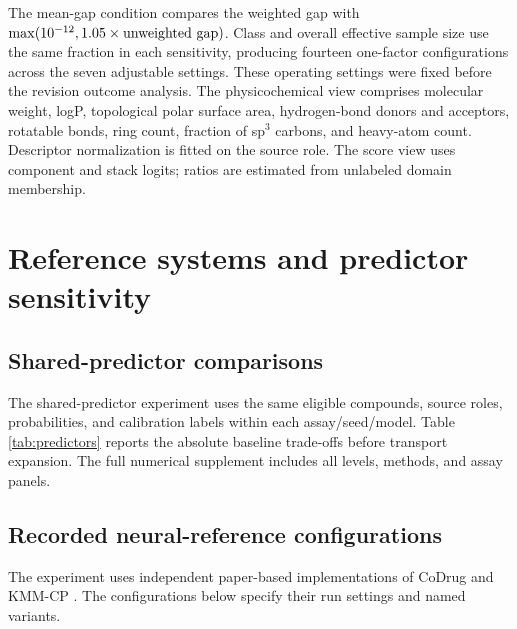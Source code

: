 The mean-gap condition compares the weighted gap with $\max(10^{-12},1.05\times\hbox{unweighted gap})$. Class and overall effective sample size use the same fraction in each sensitivity, producing fourteen one-factor configurations across the seven adjustable settings. These operating settings were fixed before the revision outcome analysis. The physicochemical view comprises molecular weight, logP, topological polar surface area, hydrogen-bond donors and acceptors, rotatable bonds, ring count, fraction of sp$^3$ carbons, and heavy-atom count. Descriptor normalization is fitted on the source role. The score view uses component and stack logits; ratios are estimated from unlabeled domain membership.

\section{Reference systems and predictor sensitivity}
\subsection{Shared-predictor comparisons}
The shared-predictor experiment uses the same eligible compounds, source roles, probabilities, and calibration labels within each assay/seed/model. Table \ref{tab:predictors} reports the absolute baseline trade-offs before transport expansion. The full numerical supplement includes all levels, methods, and assay panels.
\begin{table}[htbp]\centering\small
\caption{Ordinary Mondrian LAC with empty-set repair, historical six-assay EPA panel at $\alpha=0.10$. All entries are percentages.}\label{tab:predictors}

\end{table}
\subsection{Recorded neural-reference configurations}
The experiment uses independent paper-based implementations of CoDrug \citep{codrug2023} and KMM-CP \citep{kmm2026}. The configurations below specify their run settings and named variants.

\begin{table}[htbp]\centering\small
\caption{All ten neural reference configurations on the historical six-assay EPA panel at $\alpha=0.10$. Values are percentages. $E_1$ and $E_0$ are false-inactive and false-active exposure, respectively. Each system uses its own predictor and native deferral budget. Candidate uses candidate-label thresholds; predicted uses the paper's predicted-group interpretation. The CoDrug candidate-class variants extend its global construction.}\label{tab:reference}

\end{table}

